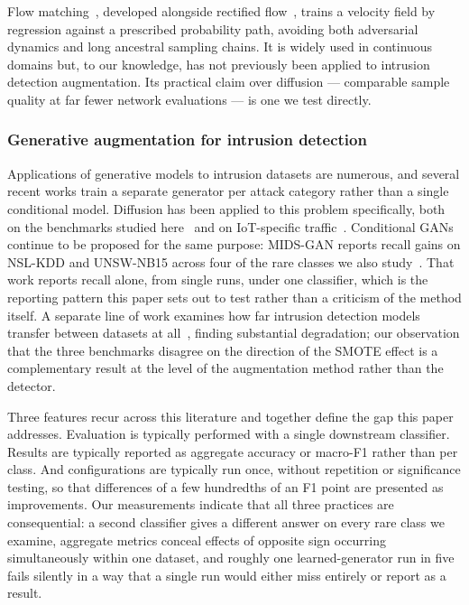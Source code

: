 \documentclass[11pt]{article}
\begin{document}
Flow matching~\cite{lipman2023flow}, developed alongside rectified flow~\cite{liu2023rectified}, trains a velocity field by regression against a prescribed probability path, avoiding both adversarial dynamics and long ancestral
sampling chains. It is widely used in continuous domains but, to our knowledge, has
not previously been applied to intrusion detection augmentation. Its practical claim
over diffusion --- comparable sample quality at far fewer network evaluations --- is
one we test directly.

\subsubsection*{Generative augmentation for intrusion detection}

Applications of generative models to intrusion datasets are numerous, and several
recent works train a separate generator per attack category rather than a single
conditional model. Diffusion has been applied to this problem specifically, both on the benchmarks studied here~\cite{yang2025diffids} and on IoT-specific traffic~\cite{wang2025dift}. Conditional GANs continue to be proposed for the same purpose: MIDS-GAN reports recall gains on NSL-KDD and UNSW-NB15 across four of the rare classes we also study~\cite{klinkhamhom2025midsgan}. That work reports recall alone, from single runs, under one classifier, which is the reporting pattern this paper sets out to test rather than a criticism of the method itself. A separate line of
work examines how far intrusion detection models transfer between datasets at
all~\cite{cantone2024machine}, finding substantial degradation; our observation that
the three benchmarks disagree on the direction of the SMOTE effect is a
complementary result at the level of the augmentation method rather than the
detector.

Three features recur across this literature and together define the gap this paper
addresses. Evaluation is typically performed with a single downstream classifier.
Results are typically reported as aggregate accuracy or macro-F1 rather than per
class. And configurations are typically run once, without repetition or significance
testing, so that differences of a few hundredths of an F1 point are presented as
improvements. Our measurements indicate that all three practices are consequential: a
second classifier gives a different answer on every rare class we examine, aggregate
metrics conceal effects of opposite sign occurring simultaneously within one dataset,
and roughly one learned-generator run in five fails silently in a way that a single
run would either miss entirely or report as a result.
\end{document}
